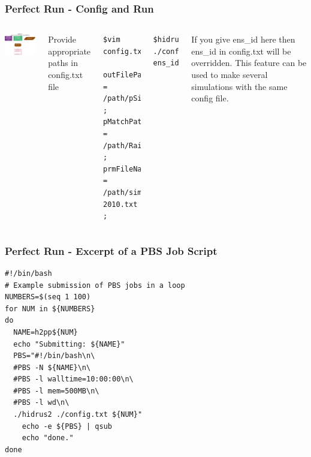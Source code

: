 \documentclass[aspectratio=169]{beamer}
\begin{document}
\begin{frame}[fragile]
\frametitle{Perfect Run - Config and Run}

\begin{columns}
	\includegraphics[width=2.5in]{../fig/runPerf_h2.pdf}

Provide appropriate paths in config.txt file
\begin{lstlisting}[style=BashInputStyle]
$vim config.txt

outFilePathPrefix = /path/pSim2010 ;
pMatchPathPrefix = /path/RainPMatch_MLB ;
prmFileName = /path/simParm-2010.txt ;
\end{lstlisting}


\begin{lstlisting}[style=BashInputStyle] 
$hidrus2 ./config.txt ens_id
\end{lstlisting}
If you give ens\_id here then ens\_id in config.txt will be overridden. This feature can be used to make several simulations with the same config file.

\end{columns}
\end{frame}
%
%
%
%
%
%
\begin{frame}[fragile]
\frametitle{Perfect Run - Excerpt of a PBS Job Script}
\begin{lstlisting}
#!/bin/bash
# Example submission of PBS jobs in a loop
NUMBERS=$(seq 1 100) 
for NUM in ${NUMBERS}
do
  NAME=h2pp${NUM}
  echo "Submitting: ${NAME}"	
  PBS="#!/bin/bash\n\
  #PBS -N ${NAME}\n\
  #PBS -l walltime=10:00:00\n\
  #PBS -l mem=500MB\n\
  #PBS -l wd\n\
  ./hidrus2 ./config.txt ${NUM}"
	echo -e ${PBS} | qsub 
	echo "done."
done

\end{lstlisting}

\end{frame}
%
%
%
%
%
%
\end{document}
